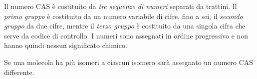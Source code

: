 Il numero CAS è costituito da \textit{tre sequenze di numeri} separati da trattini. Il \textit{primo gruppo} è costituito da un numero variabile di cifre, fino a sei, il \textit{secondo gruppo} da due cifre, mentre il \textit{terzo gruppo} è costituito da una singola cifra che serve da codice di controllo. I numeri sono assegnati in ordine progressivo e non hanno quindi nessun significato chimico.

Se una molecola ha più isomeri a ciascun isomero sarà assegnato un numero CAS differente.

